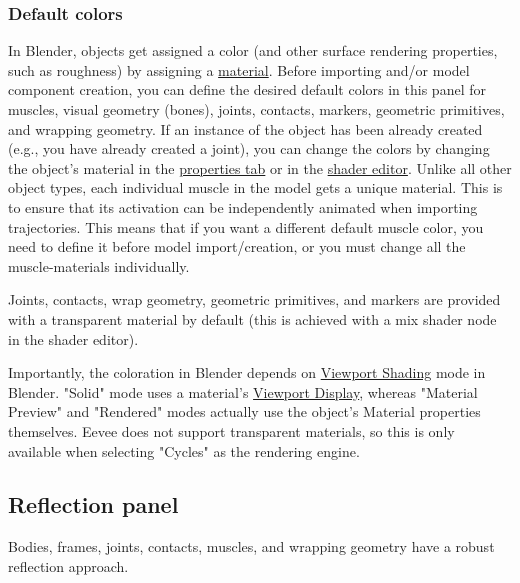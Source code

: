 \documentclass{article}
\begin{document}
\subsubsection{Default colors}
\label{sec:defaultcolors}

In Blender, objects get assigned a color (and other surface rendering properties, such as roughness) by assigning a \href{https://docs.blender.org/manual/en/latest/editors/properties_editor.html}{material}. Before importing and/or model component creation, you can define the desired default colors in this panel for muscles, visual geometry (bones), joints, contacts, markers, geometric primitives, and wrapping geometry. If an instance of the object has been already created (e.g., you have already created a joint), you can change the colors by changing the object's material in the \href{https://docs.blender.org/manual/en/latest/editors/properties_editor.html}{properties tab} or in the \href{https://docs.blender.org/manual/en/latest/editors/shader_editor.html}{shader editor}. Unlike all other object types, each individual muscle in the model gets a unique material. This is to ensure that its activation can be independently animated when importing trajectories. This means that if you want a different default muscle color, you need to define it before model import/creation, or you must change all the muscle-materials individually.

Joints, contacts, wrap geometry, geometric primitives, and markers are provided with a transparent material by default (this is achieved with a mix shader node in the shader editor).

Importantly, the coloration in Blender depends on \href{https://docs.blender.org/manual/en/latest/editors/3dview/display/shading.html}{Viewport Shading} mode in Blender. "Solid" mode uses a material's \href{https://docs.blender.org/manual/en/latest/render/workbench/display_settings.html#properties-material-viewport-display}{Viewport Display}, whereas "Material Preview" and "Rendered" modes actually use the object's Material properties themselves. Eevee does not support transparent materials, so this is only available when selecting "Cycles" as the rendering engine.

\subsection{Reflection panel}

Bodies, frames, joints, contacts, muscles, and wrapping geometry have a robust reflection approach.
\end{document}
